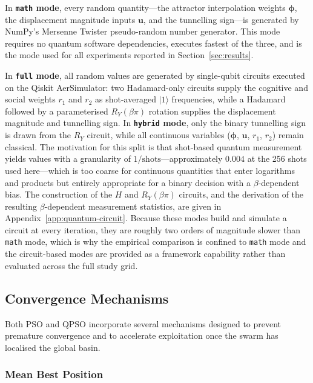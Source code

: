 In \textbf{\texttt{math} mode}, every random quantity---the attractor
interpolation weights $\boldsymbol{\phi}$, the displacement magnitude inputs
$\mathbf{u}$, and the tunnelling sign---is generated by NumPy's Mersenne
Twister pseudo-random number generator.  This mode requires no quantum software
dependencies, executes fastest of the three, and is the mode used for all
experiments reported in Section~\ref{sec:results}.

In \textbf{\texttt{full} mode}, all random values are generated by single-qubit
circuits executed on the Qiskit AerSimulator: two Hadamard-only circuits supply
the cognitive and social weights $r_1$ and $r_2$ as shot-averaged $|1\rangle$
frequencies, while a Hadamard followed by a parameterised $R_Y(\beta\pi)$
rotation supplies the displacement magnitude and tunnelling sign.  In
\textbf{\texttt{hybrid} mode}, only the binary tunnelling sign is drawn from the
$R_Y$ circuit, while all continuous variables ($\boldsymbol{\phi}$,
$\mathbf{u}$, $r_1$, $r_2$) remain classical.  The motivation for this split is
that shot-based quantum measurement yields values with a granularity of
$1/\text{shots}$---approximately $0.004$ at the 256 shots used here---which is
too coarse for continuous quantities that enter logarithms and products but
entirely appropriate for a binary decision with a $\beta$-dependent bias.  The
construction of the $H$ and $R_Y(\beta\pi)$ circuits, and the derivation of the
resulting $\beta$-dependent measurement statistics, are given in
Appendix~\ref{app:quantum-circuit}.  Because these modes build and simulate a
circuit at every iteration, they are roughly two orders of magnitude slower than
\texttt{math} mode, which is why the empirical comparison is confined to
\texttt{math} mode and the circuit-based modes are provided as a framework
capability rather than evaluated across the full study grid.


\subsection{Convergence Mechanisms}
\label{sec:meth:convergence}

Both PSO and QPSO incorporate several mechanisms designed to prevent premature
convergence and to accelerate exploitation once the swarm has localised the
global basin.

\subsubsection{Mean Best Position}


